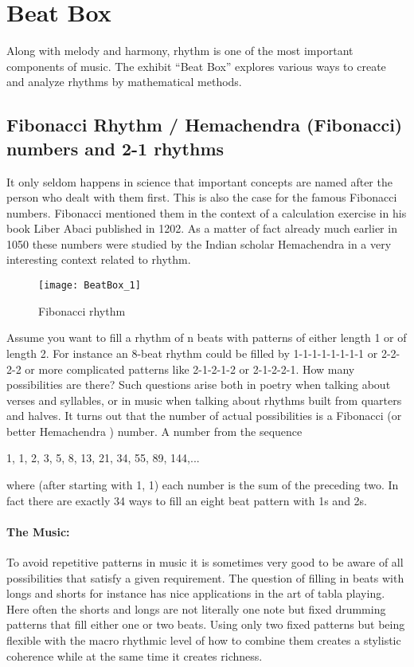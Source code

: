 \section{Beat Box}
Along with melody and harmony, rhythm is one of the most important components of music. The exhibit ``Beat Box'' explores various ways to create and analyze rhythms by mathematical methods.

\subsection{Fibonacci Rhythm / Hemachendra (Fibonacci) numbers and 2-1 rhythms}
It only seldom happens in science that important concepts are named after the person who dealt with them first. This is also the case for the famous Fibonacci numbers. Fibonacci mentioned them in the context of a calculation exercise in his book Liber Abaci published in 1202. As a matter of fact already much earlier in 1050 these numbers were studied by the Indian scholar Hemachendra in a very interesting context related to rhythm.

\begin{wrapfigure}[24]{l}{0.4\textwidth}
\centering
\texttt{[image: BeatBox\_1]}
\caption*{Fibonacci rhythm}
\end{wrapfigure}
Assume you want to fill a rhythm of n beats with patterns of either length 1 or of length 2. For instance an 8-beat rhythm could be filled by 1-1-1-1-1-1-1-1 or 2-2-2-2 or more complicated patterns like 2-1-2-1-2 or 2-1-2-2-1. How many possibilities are there? Such questions arise both in poetry when talking about verses and syllables, or in music when talking about rhythms built from quarters and halves. It turns out that the number of actual possibilities is a Fibonacci (or better Hemachendra ) number. A number from the sequence
\begin{center}
1, 1, 2, 3, 5, 8, 13, 21, 34, 55, 89, 144,...
\end{center}
where (after starting with 1, 1) each number is the sum of the preceding two. In fact there are exactly 34 ways to fill an eight beat pattern with 1s and 2s.

\paragraph{The Music:}
To avoid repetitive patterns in music it is sometimes very good to be aware of all possibilities that satisfy a given requirement. The question of filling in beats with longs and shorts for instance has nice applications in the art of tabla playing. Here often the shorts and longs are not literally one note but fixed drumming patterns that fill either one or two beats. Using only two fixed patterns but being flexible with the macro rhythmic level of how to combine them creates a stylistic coherence while at the same time it creates richness.

